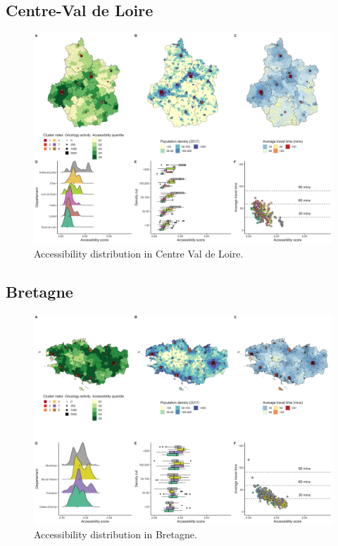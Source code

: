 \subsection*{Centre-Val de Loire}

\begin{figure}[h]
    \includegraphics[width=\textwidth]{images/camion/region_accessibility/accessibility_Centre-Val-de-Loire.png}
    \centering
    \caption{
        Accessibility distribution in Centre Val de Loire.
    }
\end{figure}

\subsection*{Bretagne}

\begin{figure}[h]
    \includegraphics[width=\textwidth]{images/camion/region_accessibility/accessibility_Bretagne.png}
    \centering
    \caption{
        Accessibility distribution in Bretagne.
    }
\end{figure}

